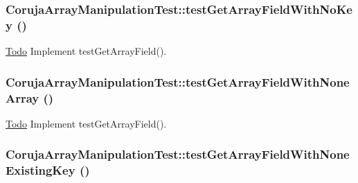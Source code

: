 \hypertarget{class_coruja_array_manipulation_test_2ce7f6b702b5c5759caa833553685277}{
\subsubsection[{testGetArrayFieldWithNoKey}]{\setlength{\rightskip}{0pt plus 5cm}CorujaArrayManipulationTest::testGetArrayFieldWithNoKey ()}}
\label{class_coruja_array_manipulation_test_2ce7f6b702b5c5759caa833553685277}


\begin{Desc}
\item[\hyperlink{todo__todo000004}{Todo}]Implement testGetArrayField(). \end{Desc}
\hypertarget{class_coruja_array_manipulation_test_0ea85caeb9df2acc96a2925cccf66657}{
\subsubsection[{testGetArrayFieldWithNoneArray}]{\setlength{\rightskip}{0pt plus 5cm}CorujaArrayManipulationTest::testGetArrayFieldWithNoneArray ()}}
\label{class_coruja_array_manipulation_test_0ea85caeb9df2acc96a2925cccf66657}


\begin{Desc}
\item[\hyperlink{todo__todo000005}{Todo}]Implement testGetArrayField(). \end{Desc}
\hypertarget{class_coruja_array_manipulation_test_0c2a0c4697a44a9bed5f743949b7ec3e}{
\subsubsection[{testGetArrayFieldWithNoneExistingKey}]{\setlength{\rightskip}{0pt plus 5cm}CorujaArrayManipulationTest::testGetArrayFieldWithNoneExistingKey ()}}
\label{class_coruja_array_manipulation_test_0c2a0c4697a44a9bed5f743949b7ec3e}


